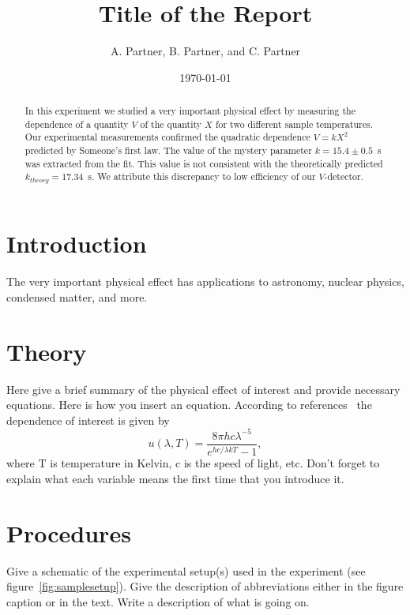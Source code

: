 \documentclass[letterpaper,12pt]{article}
\begin{document}
	
	\title{Title of the Report}
	\author{A. Partner, B. Partner, and C. Partner}
	\date{\today}
	\maketitle
	
	\begin{abstract}
		In this experiment we studied a very important physical effect by measuring the
		dependence of a quantity $V$ of the quantity $X$ for two different sample
		temperatures.  Our experimental measurements confirmed the quadratic dependence
		$V = kX^2$ predicted by Someone's first law. The value of the mystery parameter
		$k = 15.4\pm 0.5$~s was extracted from the fit. This value is
		not consistent with the theoretically predicted $k_{theory}=17.34$~s. We attribute this
		discrepancy to low efficiency of our $V$-detector.
	\end{abstract}
	
	
	\section{Introduction}
	
	The very important physical effect has applications to astronomy, nuclear physics, condensed matter, and more. 
	
	
	\section{Theory}
	
	Here give a brief summary of the physical effect of interest and provide
	necessary equations. Here is how you insert an equation. According to
	references~\cite{melissinos, Cyr, Wiki} the dependence of interest is given
	by
	\begin{equation} \label{eq:aperp} %
		u(\lambda,T)=\frac{8\pi hc\lambda^{-5}}{e^{hc/\lambda kT}-1},
	\end{equation}
	where T is temperature in Kelvin, c is the speed of light, etc. Don't forget to
	explain what each variable means the first time that you introduce it.
	
	
	\section{Procedures}
	
	Give a schematic of the experimental setup(s) used in the experiment (see
	figure~\ref{fig:samplesetup}). Give the description of  abbreviations
	either in the figure caption or in the text. Write a description of what is
	going on. 
	
\end{document}
